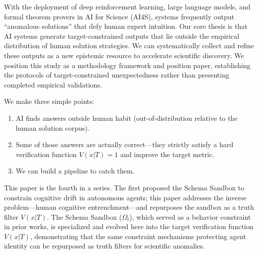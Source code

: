 \documentclass[10pt,journal,compsoc]{IEEEtran}
\begin{document}
With the deployment of deep reinforcement learning, large language models, and formal theorem provers in AI for Science (AI4S), systems frequently output ``anomalous solutions'' that defy human expert intuition. Our core thesis is that AI systems generate target-constrained outputs that lie outside the empirical distribution of human solution strategies. We can systematically collect and refine these outputs as a new epistemic resource to accelerate scientific discovery. We position this study as a methodology framework and position paper, establishing the protocols of target-constrained unexpectedness rather than presenting completed empirical validations.

We make three simple points:
\begin{enumerate}
\item AI finds answers outside human habit (out-of-distribution relative to the human solution corpus).
\item Some of those answers are actually correct---they strictly satisfy a hard verification function $V(x|T) = 1$ and improve the target metric.
\item We can build a pipeline to catch them.
\end{enumerate}

This paper is the fourth in a series. The first proposed the Schema Sandbox to constrain cognitive drift in autonomous agents; this paper addresses the inverse problem---human cognitive entrenchment---and repurposes the sandbox as a truth filter $V(x|T)$. The Schema Sandbox ($\Omega_t$), which served as a behavior constraint in prior works, is specialized and evolved here into the target verification function $V(x|T)$, demonstrating that the same constraint mechanisms protecting agent identity can be repurposed as truth filters for scientific anomalies.
\end{document}
